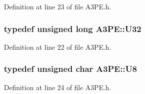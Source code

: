 Definition at line 23 of file A3PE.h.\hypertarget{classA3PE_af2773f4a4f8e9940b1e008386c4e908c}{
\subsubsection[{U32}]{\setlength{\rightskip}{0pt plus 5cm}typedef unsigned long {\bf A3PE::U32}}}
\label{classA3PE_af2773f4a4f8e9940b1e008386c4e908c}


Definition at line 22 of file A3PE.h.\hypertarget{classA3PE_ab70116c2810a9a01142a33c69fdda039}{
\subsubsection[{U8}]{\setlength{\rightskip}{0pt plus 5cm}typedef unsigned char {\bf A3PE::U8}}}
\label{classA3PE_ab70116c2810a9a01142a33c69fdda039}


Definition at line 24 of file A3PE.h.


